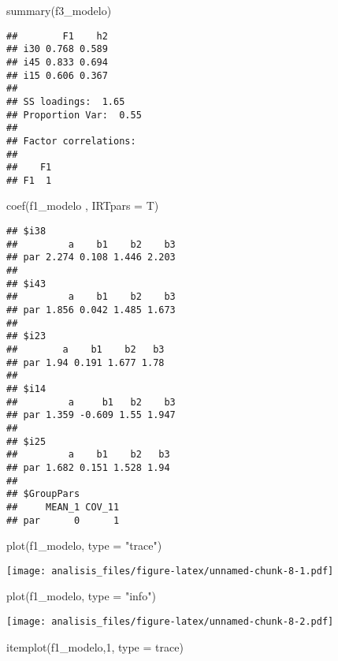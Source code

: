 \documentclass[
]{article}
\newenvironment{Shaded}{\begin{snugshade}}{\end{snugshade}}
\newcommand{\AttributeTok}[1]{\textcolor[rgb]{0.77,0.63,0.00}{#1}}
\newcommand{\DecValTok}[1]{\textcolor[rgb]{0.00,0.00,0.81}{#1}}
\newcommand{\FunctionTok}[1]{\textcolor[rgb]{0.00,0.00,0.00}{#1}}
\newcommand{\NormalTok}[1]{#1}
\newcommand{\StringTok}[1]{\textcolor[rgb]{0.31,0.60,0.02}{#1}}
\begin{document}
\begin{Shaded}
\begin{Highlighting}[]
\FunctionTok{summary}\NormalTok{(f3\_modelo)}
\end{Highlighting}
\end{Shaded}

\begin{verbatim}
##        F1    h2
## i30 0.768 0.589
## i45 0.833 0.694
## i15 0.606 0.367
## 
## SS loadings:  1.65 
## Proportion Var:  0.55 
## 
## Factor correlations: 
## 
##    F1
## F1  1
\end{verbatim}

\begin{Shaded}
\begin{Highlighting}[]
\FunctionTok{coef}\NormalTok{(f1\_modelo , }\AttributeTok{IRTpars =}\NormalTok{ T)}
\end{Highlighting}
\end{Shaded}

\begin{verbatim}
## $i38
##         a    b1    b2    b3
## par 2.274 0.108 1.446 2.203
## 
## $i43
##         a    b1    b2    b3
## par 1.856 0.042 1.485 1.673
## 
## $i23
##        a    b1    b2   b3
## par 1.94 0.191 1.677 1.78
## 
## $i14
##         a     b1   b2    b3
## par 1.359 -0.609 1.55 1.947
## 
## $i25
##         a    b1    b2   b3
## par 1.682 0.151 1.528 1.94
## 
## $GroupPars
##     MEAN_1 COV_11
## par      0      1
\end{verbatim}

\begin{Shaded}
\begin{Highlighting}[]
\FunctionTok{plot}\NormalTok{(f1\_modelo,  }\AttributeTok{type =} \StringTok{"trace"}\NormalTok{)}
\end{Highlighting}
\end{Shaded}

\texttt{[image: analisis\_files/figure-latex/unnamed-chunk-8-1.pdf]}

\begin{Shaded}
\begin{Highlighting}[]
\FunctionTok{plot}\NormalTok{(f1\_modelo,  }\AttributeTok{type =} \StringTok{"info"}\NormalTok{)}
\end{Highlighting}
\end{Shaded}

\texttt{[image: analisis\_files/figure-latex/unnamed-chunk-8-2.pdf]}

\begin{Shaded}
\begin{Highlighting}[]
\FunctionTok{itemplot}\NormalTok{(f1\_modelo,}\DecValTok{1}\NormalTok{, }\AttributeTok{type =} \StringTok{\textquotesingle{}trace\textquotesingle{}}\NormalTok{)}
\end{Highlighting}
\end{Shaded}
\end{document}
